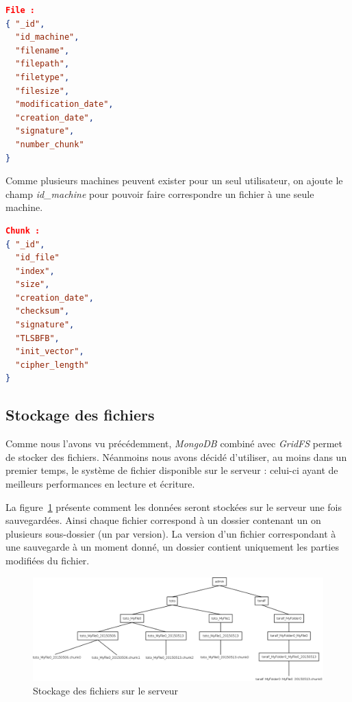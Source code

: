 \documentclass[a4paper,10pt, twoside]{report}
\begin{document}
\begin{spacing}{1.2}
\begin{lstlisting}[language=json]
File :
{ "_id",
  "id_machine",
  "filename",
  "filepath",
  "filetype",
  "filesize",
  "modification_date",
  "creation_date",
  "signature",
  "number_chunk"
}
\end{lstlisting}
Comme plusieurs machines peuvent exister pour un seul utilisateur, on ajoute
le champ \textit{id\_machine} pour pouvoir faire correspondre un fichier à
une seule machine.

\begin{lstlisting}[language=json]
Chunk :
{ "_id",
  "id_file"
  "index",
  "size",
  "creation_date",
  "checksum",
  "signature",
  "TLSBFB",
  "init_vector",
  "cipher_length"
}
\end{lstlisting}

\subsection{Stockage des fichiers}
Comme nous l'avons vu précédemment, \textit{MongoDB} combiné avec
\textit{GridFS} permet de stocker des fichiers. Néanmoins nous avons
décidé d'utiliser, au moins dans un premier temps, le système de fichier
disponible sur le serveur : celui-ci ayant de meilleurs performances en lecture
et écriture.

La figure~\ref{fileSystemServer} présente comment les données seront
stockées sur le serveur une fois sauvegardées. Ainsi chaque fichier
correspond à un dossier contenant un on plusieurs sous-dossier (un par
version). La version d'un fichier correspondant à une sauvegarde à un moment
donné, un dossier contient uniquement les parties modifiées du fichier.

\begin{figure}[h!]
  \hspace{-4.5em}
  \includegraphics[width=19cm]{softwareDesign/fileSystemServer.png}
  \caption{\label{fileSystemServer} Stockage des fichiers sur le serveur}
\end{figure}


\end{spacing}
\end{document}
